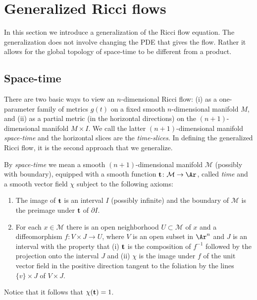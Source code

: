\section{Generalized Ricci flows}

In this section we introduce a generalization of the Ricci flow
equation. The generalization does not involve changing the PDE that
gives the flow. Rather it allows for the global topology of
space-time to be different from a product.
\subsection{Space-time}

There are two basic ways to view an $n$-dimensional Ricci flow: (i)
as a one-parameter family of metrics $g(t)$ on a fixed smooth
$n$-dimensional manifold $M$, and (ii) as a partial metric (in the
horizontal directions) on the $(n+1)$-dimensional manifold $M\times
I$. We call the latter $(n+1)$-dimensional manifold {\sl
space-time} and the
horizontal slices are the {\em time-slices}. In defining the
generalized Ricci flow, it is the second approach that we
generalize.

\begin{definition}\label{def:generalized-spacetime}
\leanok
By {\em space-time} we mean a smooth $(n+1)$-dimensional manifold
${\mathcal M}$ (possibly with boundary), equipped with a smooth
function ${\bf t}\colon {\mathcal M}\to \Ar$, called {\em time} and
a smooth vector field $\chi$ subject to the following axioms:
\begin{enumerate}
\item The image of ${\bf t}$ is an interval $I$ (possibly infinite) and
the boundary of ${\mathcal M}$ is the preimage under ${\bf t}$ of
$\partial I$.
\item For each $x\in {\mathcal M}$ there is an open neighborhood $U\subset
{\mathcal M}$ of $x$ and a diffeomorphism $f\colon  V\times J\to U$,
where $V$ is an open subset in $\Ar ^n$ and $J$ is an interval with
the property that (i) ${\bf t}$ is the composition of $f^{-1}$
followed by the projection onto the interval $J$ and (ii) $\chi$ is
the image under $f$ of the unit vector field in the positive
direction tangent to the foliation by the lines $\{v\}\times J$ of
$V\times J$.
\end{enumerate}
\end{definition}

 Notice that it follows
that $\chi({\bf t})=1$.




